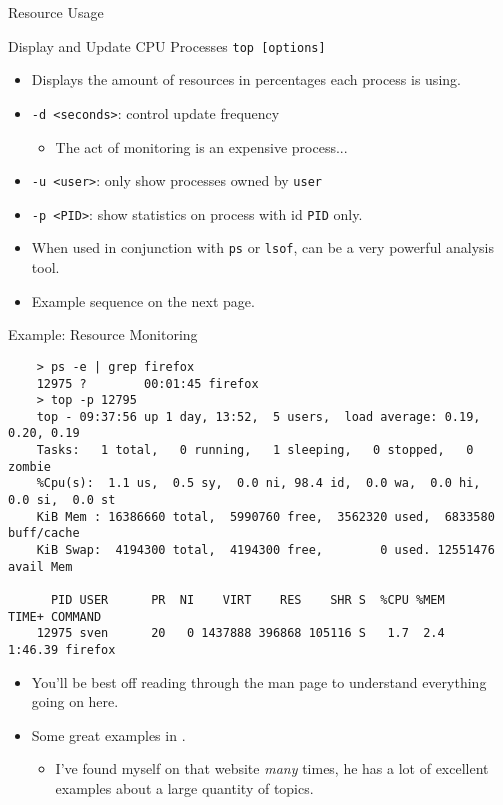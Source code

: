 \begin{frame}[fragile]{Resource Usage}
  \begin{block}{Display and Update  CPU Processes}
    \texttt{top [options]}
    \begin{itemize}
      \item Displays the amount of resources in percentages each process is using.
      \item \texttt{-d <seconds>}: control update frequency
      \begin{itemize}
        \item The act of monitoring is an expensive process...
      \end{itemize}
      \item \texttt{-u <user>}: only show processes owned by \texttt{user}
      \item \texttt{-p <PID>}: show statistics on process with id \texttt{PID} only.
    \end{itemize}
  \end{block}
  \begin{itemize}[<+- | alert@+>]
    \item When used in conjunction with \texttt{ps} or \texttt{lsof}, can be a very powerful analysis tool.
    \item Example sequence on the next page.
  \end{itemize}
\end{frame}

\begin{frame}[fragile]{Example: Resource Monitoring}
  \begin{verbatim}
    > ps -e | grep firefox
    12975 ?        00:01:45 firefox
    > top -p 12795
    top - 09:37:56 up 1 day, 13:52,  5 users,  load average: 0.19, 0.20, 0.19
    Tasks:   1 total,   0 running,   1 sleeping,   0 stopped,   0 zombie
    %Cpu(s):  1.1 us,  0.5 sy,  0.0 ni, 98.4 id,  0.0 wa,  0.0 hi,  0.0 si,  0.0 st
    KiB Mem : 16386660 total,  5990760 free,  3562320 used,  6833580 buff/cache
    KiB Swap:  4194300 total,  4194300 free,        0 used. 12551476 avail Mem

      PID USER      PR  NI    VIRT    RES    SHR S  %CPU %MEM     TIME+ COMMAND
    12975 sven      20   0 1437888 396868 105116 S   1.7  2.4   1:46.39 firefox
  \end{verbatim}
  \begin{itemize}[<+- | alert@+>]
    \item You'll be best off reading through the man page to understand everything going on here.
    \item Some great examples in \cite{top}.
    \begin{itemize}[<+- | alert@+>]
      \item I've found myself on that website \emph{many} times, he has a lot of excellent examples about
            a large quantity of topics.
    \end{itemize}
  \end{itemize}
\end{frame}

